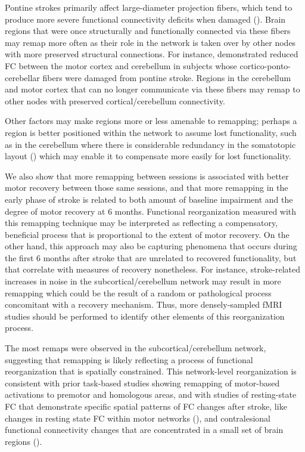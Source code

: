 \documentclass[phd,tocprelim]{cornell}
\begin{document}
    Pontine strokes primarily affect large-diameter projection fibers, which tend to produce more severe functional connectivity deficits when damaged (\cite{Griffis2020-hx}). Brain regions that were once structurally and functionally connected via these fibers may remap more often as their role in the network is taken over by other nodes with more preserved structural connections. For instance, \cite{Lu2011-ow} demonstrated reduced FC between the motor cortex and cerebellum in subjects whose cortico-ponto-cerebellar fibers were damaged from pontine stroke. Regions in the cerebellum and motor cortex that can no longer communicate via these fibers may remap to other nodes with preserved cortical/cerebellum connectivity.
    
     Other factors may make regions more or less amenable to remapping; perhaps a region is better positioned within the network to assume lost functionality, such as in the cerebellum where there is considerable redundancy in the somatotopic layout (\cite{Mottolese2013-sd}) which may enable it to compensate more easily for lost functionality.
    
    We also show that more remapping between sessions is associated with better motor recovery between those same sessions, and that more remapping in the early phase of stroke is related to both amount of baseline impairment and the degree of motor recovery at 6 months. Functional reorganization measured with this remapping technique may be interpreted as reflecting a compensatory, beneficial process that is proportional to the extent of motor recovery. On the other hand, this approach may also be capturing phenomena that occurs during the first 6 months after stroke that are unrelated to recovered functionality, but that correlate with measures of recovery nonetheless. For instance, stroke-related increases in noise in the subcortical/cerebellum network may result in more remapping which could be the result of a random or pathological process concomitant with a recovery mechanism. Thus, more densely-sampled fMRI studies should be performed to identify other elements of this reorganization process. 
        
    The most remaps were observed in the subcortical/cerebellum network, suggesting that remapping is likely reflecting a process of functional reorganization that is spatially constrained. This network-level reorganization is consistent with prior task-based studies showing remapping of motor-based activations to premotor and homologous areas, and with studies of resting-state FC that demonstrate specific spatial patterns of FC changes after stroke, like changes in resting state FC within motor networks (\cite{Zhang2016-vg}), and contralesional functional connectivity changes that are concentrated in a small set of brain regions (\cite{Yourganov2021-hd}).
     
\end{document}
